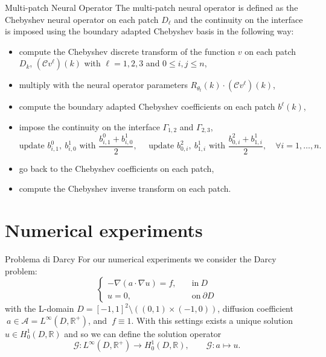 \documentclass{beamer}
\newcommand{\numberset}{\mathbb}
\newcommand{\R}{\numberset{R}}
\begin{document}
\begin{frame}{Multi-patch Neural Operator}
	The multi-patch neural operator is defined as the Chebyshev neural operator on each patch $D_\ell$ and the continuity on the interface is imposed using the boundary adapted Chebyshev basis in the following way:
	\begin{itemize}
		\item compute the Chebyshev discrete transform of the function $v$ on each patch $D_k$, $(\mathcal{C}v^{\ell})(k)$ with $\ell=1,2,3$ and $0 \le i,j \le n$,
		\item multiply with the neural operator parameters $R_{\theta_t}(k) \cdot (\mathcal{C}v^{\ell})(k)$,
		\item compute the boundary adapted Chebyshev coefficients on each patch $b^{\ell}(k)$,
		\item impose the continuity on the interface $\Gamma_{1,2}$ and $\Gamma_{2,3}$,
		      \[ \text{update } b^{0}_{i, 1},\ b^{1}_{i,0} \text{ with } \frac{b^{0}_{i, 1} + b^{1}_{i,0}}{2}, \quad  \text{ update } b^{2}_{0,i}, \ b^{1}_{1, i} \text{ with } \frac{b^{2}_{0,i} + b^{1}_{1, i}}{2}, \quad \forall i = 1, \dots, n.\]
		\item go back to the Chebyshev coefficients on each patch,
		\item compute the Chebyshev inverse transform on each patch.
	\end{itemize}
	
\end{frame}


\section{Numerical experiments}


\begin{frame}{Problema di Darcy}
	For our numerical experiments we consider the Darcy problem:
	\[ 	\begin{cases}
			- \nabla(a \cdot \nabla u) = f,\quad & \mathrm{in}\ D            \\
			u = 0,                               & \mathrm{on} \ \partial D
		\end{cases} \]
	with the L-domain $ D = [-1, 1]^2\setminus ((0,1)\times (-1,0)) $, diffusion coefficient $\ a \in \mathcal{A} = L^{\infty}(D, \R^+) $,  and $\ f \equiv 1 $. With this settings exists a unique solution $ u \in H^1_0(D, \R) $ and so we can define the solution operator 
	\[  \mathcal{G}: L^{\infty}(D, \R^+) \to H^1_0(D, \R), \qquad \mathcal{G}:a \mapsto u. \]
\end{frame}
\end{document}
